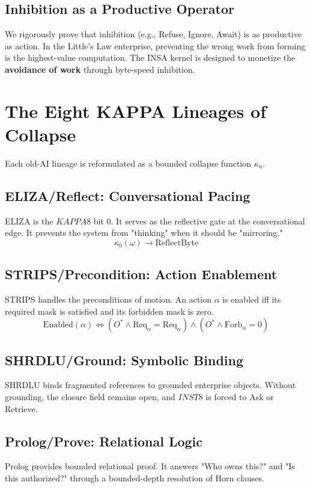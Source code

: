 \documentclass[12pt,a4paper,oneside]{book}
\begin{document}
\section{Inhibition as a Productive Operator}
We rigorously prove that inhibition (e.g., Refuse, Ignore, Await) is as productive as action. In the Little's Law enterprise, preventing the wrong work from forming is the highest-value computation. The INSA kernel is designed to monetize the \textbf{avoidance of work} through byte-speed inhibition.

\chapter{The Eight KAPPA Lineages of Collapse}

Each old-AI lineage is reformulated as a bounded collapse function $\kappa_n$.

\section{ELIZA/Reflect: Conversational Pacing}
ELIZA is the $KAPPA8$ bit 0. It serves as the reflective gate at the conversational edge. It prevents the system from "thinking" when it should be "mirroring." 
\begin{equation}
\kappa_0(\omega) \to \text{ReflectByte}
\end{equation}

\section{STRIPS/Precondition: Action Enablement}
STRIPS handles the preconditions of motion. An action $\alpha$ is enabled iff its required mask is satisfied and its forbidden mask is zero.
\begin{equation}
\text{Enabled}(\alpha) \iff (O^* \wedge \text{Req}_{\alpha} = \text{Req}_{\alpha}) \wedge (O^* \wedge \text{Forb}_{\alpha} = 0)
\end{equation}

\section{SHRDLU/Ground: Symbolic Binding}
SHRDLU binds fragmented references to grounded enterprise objects. Without grounding, the closure field remains open, and $INST8$ is forced to Ask or Retrieve.

\section{Prolog/Prove: Relational Logic}
Prolog provides bounded relational proof. It answers "Who owns this?" and "Is this authorized?" through a bounded-depth resolution of Horn clauses.
\end{document}
